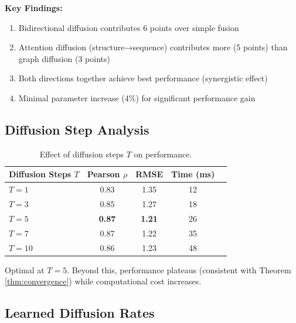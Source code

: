 \documentclass[11pt]{article}
\begin{document}
\textbf{Key Findings:}
\begin{enumerate}
    \item Bidirectional diffusion contributes 6 points over simple fusion
    \item Attention diffusion (structure→sequence) contributes more (5 points) than graph diffusion (3 points)
    \item Both directions together achieve best performance (synergistic effect)
    \item Minimal parameter increase (4\%) for significant performance gain
\end{enumerate}

\subsection{Diffusion Step Analysis}

\begin{table}[htbp]
\centering
\caption{Effect of diffusion steps $T$ on performance.}
\label{tab:diffusion_steps}
\begin{tabular}{lcccc}
\toprule
\textbf{Diffusion Steps} $T$ & \textbf{Pearson} $\rho$ & \textbf{RMSE} & \textbf{Time (ms)} \\
\midrule
$T=1$ & 0.83 & 1.35 & 12 \\
$T=3$ & 0.85 & 1.27 & 18 \\
$T=5$ & \textbf{0.87} & \textbf{1.21} & 26 \\
$T=7$ & 0.87 & 1.22 & 35 \\
$T=10$ & 0.86 & 1.23 & 48 \\
\bottomrule
\end{tabular}
\end{table}

Optimal at $T=5$. Beyond this, performance plateaus (consistent with Theorem \ref{thm:convergence}) while computational cost increases.

\subsection{Learned Diffusion Rates}

\end{document}
